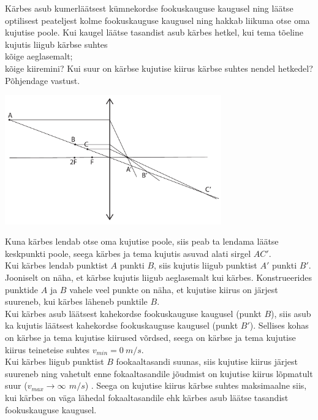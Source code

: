 \setAuthor{}

Kärbes asub kumerläätsest kümnekordse fookuskauguse kaugusel ning läätse optilisest peateljest kolme fookuskauguse kaugusel ning hakkab liikuma otse oma kujutise poole. Kui kaugel läätse tasandist asub kärbes hetkel, kui tema tõeline kujutis liigub kärbse suhtes\\
\osa kõige aeglasemalt;\\
\osa kõige kiiremini? Kui suur on kärbse kujutise kiirus kärbse suhtes nendel hetkedel? Põhjendage vastust. 

\hint

\solu
\vspace{-20pt}
  \begin{center}
    \includegraphics[width=0.7\textwidth]{2019-v2g-03-yl.pdf}
  \end{center}
  \vspace{-20pt}


Kuna kärbes lendab otse oma kujutise poole, siis peab ta lendama läätse keskpunkti poole, seega kärbes ja tema kujutis asuvad alati sirgel $AC'$. \\ 
Kui kärbes lendab punktist $A$ punkti $B$, siis kujutis liigub punktist $A'$ punkti $B'$. Jooniselt on näha, et kärbse kujutis liigub aeglasemalt kui kärbes. Konstrueerides punktide $A$ ja $B$ vahele veel punkte on näha, et kujutise kiirus on järjest suureneb, kui kärbes läheneb punktile $B$. \\
Kui kärbes asub läätsest kahekordse fookuskauguse kaugusel (punkt $B$), siis asub ka kujutis läätsest kahekordse fookuskauguse kaugusel (punkt $B'$).  Sellises kohas on kärbse ja tema kujutise kiirused võrdsed, seega on kärbse ja tema kujutise kiirus teineteise suhtes $v_{min} = \SI{0}{m/s}$. \\
Kui kärbes liigub punktist $B$ fookaaltasandi suunas, siis kujutise kiirus järjest suureneb  ning vahetult enne fokaaltasandile jõudmist on kujutise kiirus lõpmatult suur ($v_{max} \rightarrow \infty\SI{}{\,m/s}$) . Seega on kujutise kiirus kärbse suhtes maksimaalne siis, kui kärbes on väga lähedal fokaaltasandile ehk kärbes asub läätse tasandist fookuskauguse kaugusel. 
\probend